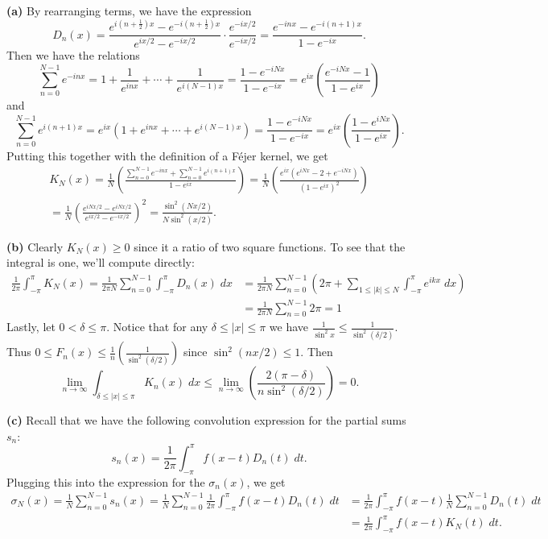 \documentclass[11pt,letterpaper]{article}
\begin{document}
\begin{solution}
    \textbf{(a)} By rearranging terms, we have the expression 
    \[
        D_n(x)=\frac{e^{i(n+\frac{1}{2})x}-e^{-i(n+\frac{1}{2})x}}{e^{ix /2} - e^{-ix/2}}\cdot \frac{e^{-ix /2}}{e^{-ix /2}} = \frac{e^{-inx}-e^{-i(n+1)x}}{1-e^{-ix}}
    .\] 
    Then we have the relations
    \[
        \sum^{N-1}_{n=0}e^{-inx} = 1 + \frac{1}{e^{inx}}+\cdots+\frac{1}{e^{i(N-1)x}} = \frac{1-e^{-iNx}}{1-e^{-ix}}=e^{ix}\left(\frac{e^{-iNx}-1}{1-e^{ix}}\right)
    \]
    and 
    \[
        \sum^{N-1}_{n=0}e^{i(n+1)x} = e^{ix}(1 + {e^{inx}}+\cdots+{e^{i(N-1)x}}) = \frac{1-e^{-iNx}}{1-e^{-ix}}=e^{ix}\left(\frac{1-e^{iNx}}{1-e^{ix}}\right).
    \]
    Putting this together with the definition of a F\'ejer kernel, we get
    \[
        \begin{aligned}
            K_N(x)=\frac{1}{N}\left(\frac{\sum^{N-1}_{n=0}e^{-inx} + \sum^{N-1}_{n=0}e^{i(n+1)x}}{1-e^{ix}}\right)=\frac{1}{N}\left(\frac{e^{ix}(e^{iNx}-2+e^{-iNx})}{(1-e^{ix})^2}\right)\\
            =\frac{1}{N}\left(\frac{e^{iNx/2}-e^{iNx /2}}{e^{ix /2} - e^{-ix /2}}\right)^2 = \frac{\sin^2(N x/2)}{N\sin^2(x /2)}.
        \end{aligned}
    \] 
    
    \textbf{(b)} Clearly $K_N(x)\geq 0$ since it a ratio of two square functions. To see that the integral is one, we'll compute directly:
    \[
        \begin{aligned}
            \frac{1}{2\pi}\int^\pi_{-\pi}K_N(x)=\frac{1}{2\pi N}\sum^{N-1}_{n=0}\int^\pi_{-\pi}D_n(x)\;dx&=\frac{1}{2\pi N}\sum^{N-1}_{n=0}\left(2\pi + \sum_{1\leq |k|\leq N}\int^{\pi}_{-\pi}e^{ikx}\;dx\right)\\ 
            &=\frac{1}{2\pi N}\sum^{N-1}_{n=0}2\pi = 1
        \end{aligned}
    \] 
    Lastly, let $0<\delta\leq \pi$. Notice that for any $\delta \leq |x|\leq \pi$ we have $\frac{1}{\sin^2 x}\leq \frac{1}{\sin^2(\delta /2)}$. Thus $0\leq F_n(x)\leq \frac{1}{n}\left(\frac{1}{\sin^2(\delta /2)}\right)$ since $\sin^2(nx /2) \leq 1$. Then 
    \[
        \lim_{n\to \infty}\int_{\delta\leq |x|\leq \pi} K_n(x)\;dx \leq \lim_{n\to \infty} \left(\frac{2(\pi-\delta)}{n \sin^2(\delta /2)}\right) = 0
    .\]  

    \textbf{(c)} Recall that we have the following convolution expression for the partial sums $s_n$:
    \[
        s_n(x) = \frac{1}{2\pi}\int^{\pi}_{-\pi}f(x-t)D_n(t)\;dt
    .\] 
    Plugging this into the expression for the $\sigma_n(x)$, we get
    \[
        \begin{aligned}
            \sigma_N(x)=\frac{1}{N}\sum^{N-1}_{n=0}s_n(x)=\frac{1}{N}\sum^{N-1}_{n=0}\frac{1}{2\pi}\int^\pi_{-\pi}f(x-t)D_n(t)\;dt
            &=\frac{1}{2\pi}\int^\pi_{-\pi}f(x-t)\frac{1}{N}\sum^{N-1}_{n=0}D_n(t)\;dt\\
            &=\frac{1}{2\pi}\int^{\pi}_{-\pi}f(x-t)K_N(t)\;dt.
        \end{aligned}
    \]
    

\end{solution}
\end{document}
